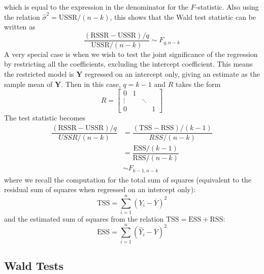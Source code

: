 \documentclass[11pt]{report} %
\begin{document}
which is equal to the expression in the denominator for the $F$-statistic. Also using the relation $\widehat{\sigma}^{2} = \mathrm{USSR}/\left(n - k\right)$, this shows that the Wald test statistic can be written as
\begin{equation}
\dfrac{\left(\mathrm{RSSR} - \mathrm{USSR}\right)/q}{\mathrm{USSR}/\left(n - k\right)} \sim F_{q, n- k}
\end{equation}
A very special case is when we wish to test the joint significance of the regression by restricting all the coefficients, excluding the intercept coefficient. This means the restricted model is $\mathbf{Y}$ regressed on an intercept only, giving an estimate as the sample mean of $\mathbf{Y}$. Then in this case, $q = k - 1$ and $R$ takes the form
\begin{equation}
R = \begin{bmatrix}
0 & 1 &  \\
\vdots &  & \ddots \\
0 & & & 1
\end{bmatrix}
\end{equation}
The test statistic becomes
\begin{align}
\dfrac{\left(\mathrm{RSSR} - \mathrm{USSR}\right)/q}{USSR/\left(n - k\right)} &= \dfrac{\left(\mathrm{TSS} - \mathrm{RSS}\right)/\left(k - 1\right)}{RSS/\left(n - k\right)} \\
&= \dfrac{\mathrm{ESS}/\left(k - 1\right)}{\mathrm{RSS}/\left(n - k\right)} \\
&\sim F_{k - 1, n- k}
\end{align}
where we recall the computation for the total sum of squares (equivalent to the residual sum of squares when regressed on an intercept only):
\begin{equation}
\mathrm{TSS} = \sum_{i = 1}^{n}\left(Y_{i} - \overline{Y}\right)^{2}
\end{equation}
and the estimated sum of squares from the relation $\mathrm{TSS} = \mathrm{ESS} + \mathrm{RSS}$:
\begin{equation}
\mathrm{ESS} = \sum_{i = 1}^{n}\left(\widehat{Y}_{i} - \overline{Y}\right)^{2}
\end{equation}

\subsection{Wald Tests}
\end{document}
